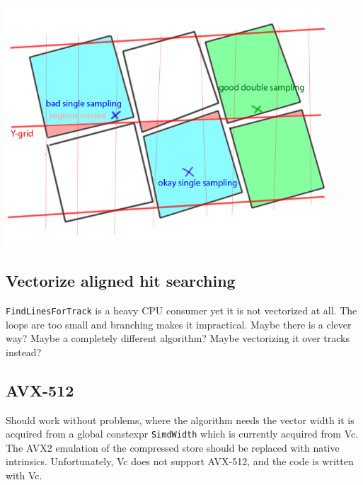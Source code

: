 \documentclass[12pt]{article}
\newcommand{\code}[1]{\texttt{#1}}
\begin{document}
\includegraphics[width=0.9\textwidth]{images/y_double_binning.jpg}

\subsection{Vectorize aligned hit searching}

\code{FindLinesForTrack} is a heavy CPU consumer yet it is not vectorized at all. The loops are too small and branching makes it impractical. Maybe there is a clever way? Maybe a completely different algorithm? Maybe vectorizing it over tracks instead?


\subsection{AVX-512}

Should work without problems, where the algorithm needs the vector width it is acquired from a global constexpr \code{SimdWidth} which is currently acquired from Vc. The AVX2 emulation of the compressed store should be replaced with native intrinsics. Unfortunately, Vc does not support AVX-512, and the code is written with Vc.
\end{document}
